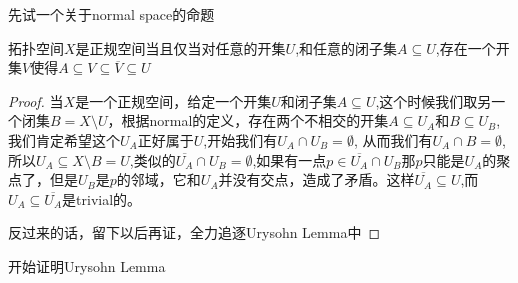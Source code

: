 先试一个关于normal space的命题
\begin{proposition}
拓扑空间$X$是正规空间当且仅当对任意的开集$U$,和任意的闭子集$A \subseteq U$,存在一个开集$V$使得$A \subseteq V \subseteq \overline{V} \subseteq U$
\end{proposition}

\begin{proof}
当$X$是一个正规空间，给定一个开集$U$和闭子集$A \subseteq U$,这个时候我们取另一个闭集$B = X \setminus U$，根据normal的定义，存在两个不相交的开集$A \subseteq U_A$和$B \subseteq U_B$,我们肯定希望这个$U_A$正好属于$U$,开始我们有$U_A \cap U_B = \emptyset$, 从而我们有$U_A \cap B = \emptyset$,所以$U_A \subseteq X \setminus B = U$,类似的$\overline{U_A} \cap U_B = \emptyset$,如果有一点$p \in \overline{U_A} \cap U_B$那$p$只能是$U_A$的聚点了，但是$U_B$是$p$的邻域，它和$U_A$并没有交点，造成了矛盾。这样$\overline{U_A} \subseteq U$,而$U_A \subseteq \overline{U_A}$是trivial的。

反过来的话，留下以后再证，全力追逐Urysohn Lemma中
\end{proof}

开始证明Urysohn Lemma

